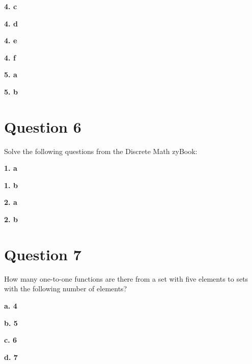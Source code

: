 \documentclass[11pt]{article}
\begin{document}
	\vspace{10mm}
	\textbf{4. c}
	
	\vspace{10mm}
	\textbf{4. d}
	
	\vspace{10mm}
	\textbf{4. e}
	
	\vspace{10mm}
	\textbf{4. f}
	
	\vspace{10mm}
	\textbf{5. a}
	
	\vspace{10mm}
	\textbf{5. b}

	
	\newpage
	\section*{Question 6}
	Solve the following questions from the Discrete Math zyBook:
	
	\textbf{1. a}
	
	\vspace{10mm}
	\textbf{1. b}
	
	\vspace{10mm}
	\textbf{2. a}
	
	\vspace{10mm}
	\textbf{2. b}
	
	\newpage
	\section*{Question 7}
	How many one-to-one functions are there from a set with five elements to sets with the following number of elements?
	
	\textbf{a. 4}
	
	\textbf{b. 5}
	
	\textbf{c. 6}
	
	\textbf{d. 7}
	
	
\end{document}
